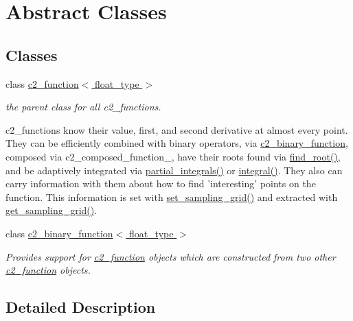 \hypertarget{group__abstract__classes}{\section{Abstract Classes}
\label{group__abstract__classes}
}
\subsection*{Classes}
\begin{DoxyCompactItemize}
\item 
class \hyperlink{classc2__function}{c2\-\_\-function$<$ float\-\_\-type $>$}
\begin{DoxyCompactList}\small\item\em the parent class for all c2\-\_\-functions.

c2\-\_\-functions know their value, first, and second derivative at almost every point. They can be efficiently combined with binary operators, via \hyperlink{classc2__binary__function}{c2\-\_\-binary\-\_\-function}, composed via c2\-\_\-composed\-\_\-function\-\_\-, have their roots found via \hyperlink{classc2__function_acd17a7191226578c866d82cb2e9ff89f}{find\-\_\-root()}, and be adaptively integrated via \hyperlink{classc2__function_a89ce5e2f44ebfaf9eb4d66605cde4fde}{partial\-\_\-integrals()} or \hyperlink{classc2__function_a675c5056562332be2e49b38485d322b7}{integral()}. They also can carry information with them about how to find 'interesting' points on the function. This information is set with \hyperlink{classc2__function_a23828c75121b442899ab7a80cf5abbb0}{set\-\_\-sampling\-\_\-grid()} and extracted with \hyperlink{classc2__function_ad03264dcc015e5d0b1b6eb30df3f32be}{get\-\_\-sampling\-\_\-grid()}. \end{DoxyCompactList}\item 
class \hyperlink{classc2__binary__function}{c2\-\_\-binary\-\_\-function$<$ float\-\_\-type $>$}
\begin{DoxyCompactList}\small\item\em Provides support for \hyperlink{classc2__function}{c2\-\_\-function} objects which are constructed from two other \hyperlink{classc2__function}{c2\-\_\-function} objects. \end{DoxyCompactList}\end{DoxyCompactItemize}


\subsection{Detailed Description}
